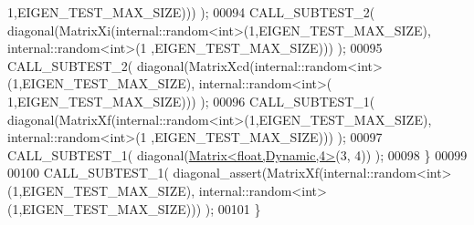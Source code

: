 \begin{DoxyCode}
      1,EIGEN\_TEST\_MAX\_SIZE))) );
00094     CALL\_SUBTEST\_2( diagonal(MatrixXi(internal::random<int>(1,EIGEN\_TEST\_MAX\_SIZE), internal::random<int>(1
      ,EIGEN\_TEST\_MAX\_SIZE))) );
00095     CALL\_SUBTEST\_2( diagonal(MatrixXcd(internal::random<int>(1,EIGEN\_TEST\_MAX\_SIZE), internal::random<int>(
      1,EIGEN\_TEST\_MAX\_SIZE))) );
00096     CALL\_SUBTEST\_1( diagonal(MatrixXf(internal::random<int>(1,EIGEN\_TEST\_MAX\_SIZE), internal::random<int>(1
      ,EIGEN\_TEST\_MAX\_SIZE))) );
00097     CALL\_SUBTEST\_1( diagonal(\hyperlink{group___core___module_class_eigen_1_1_matrix}{Matrix<float,Dynamic,4>}(3, 4)) );
00098   \}
00099 
00100   CALL\_SUBTEST\_1( diagonal\_assert(MatrixXf(internal::random<int>(1,EIGEN\_TEST\_MAX\_SIZE), 
      internal::random<int>(1,EIGEN\_TEST\_MAX\_SIZE))) );
00101 \}
\end{DoxyCode}
